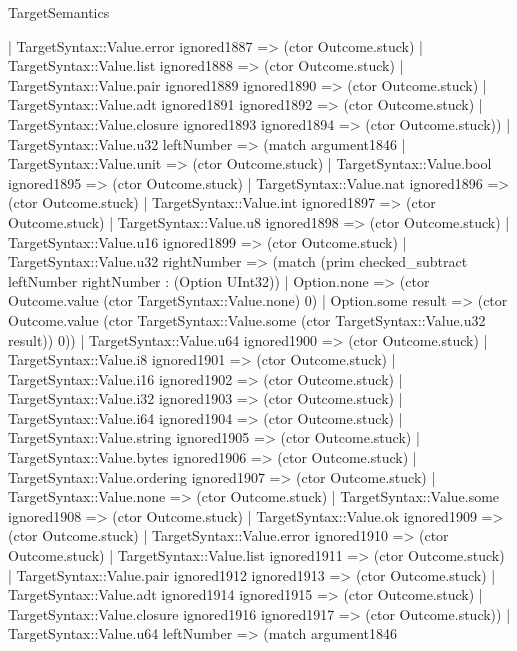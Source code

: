 \begin{lexlean}{TargetSemantics}
\begin{semanticmodule}
{              | TargetSyntax::Value.error ignored1887 => (ctor Outcome.stuck)
              | TargetSyntax::Value.list ignored1888 => (ctor Outcome.stuck)
              | TargetSyntax::Value.pair ignored1889 ignored1890 => (ctor Outcome.stuck)
              | TargetSyntax::Value.adt ignored1891 ignored1892 => (ctor Outcome.stuck)
              | TargetSyntax::Value.closure ignored1893 ignored1894 => (ctor Outcome.stuck))
            | TargetSyntax::Value.u32 leftNumber => (match argument1846
              | TargetSyntax::Value.unit => (ctor Outcome.stuck)
              | TargetSyntax::Value.bool ignored1895 => (ctor Outcome.stuck)
              | TargetSyntax::Value.nat ignored1896 => (ctor Outcome.stuck)
              | TargetSyntax::Value.int ignored1897 => (ctor Outcome.stuck)
              | TargetSyntax::Value.u8 ignored1898 => (ctor Outcome.stuck)
              | TargetSyntax::Value.u16 ignored1899 => (ctor Outcome.stuck)
              | TargetSyntax::Value.u32 rightNumber => (match (prim checked_subtract leftNumber rightNumber : (Option UInt32))
                | Option.none => (ctor Outcome.value (ctor TargetSyntax::Value.none) 0)
                | Option.some result => (ctor Outcome.value (ctor TargetSyntax::Value.some (ctor TargetSyntax::Value.u32 result)) 0))
              | TargetSyntax::Value.u64 ignored1900 => (ctor Outcome.stuck)
              | TargetSyntax::Value.i8 ignored1901 => (ctor Outcome.stuck)
              | TargetSyntax::Value.i16 ignored1902 => (ctor Outcome.stuck)
              | TargetSyntax::Value.i32 ignored1903 => (ctor Outcome.stuck)
              | TargetSyntax::Value.i64 ignored1904 => (ctor Outcome.stuck)
              | TargetSyntax::Value.string ignored1905 => (ctor Outcome.stuck)
              | TargetSyntax::Value.bytes ignored1906 => (ctor Outcome.stuck)
              | TargetSyntax::Value.ordering ignored1907 => (ctor Outcome.stuck)
              | TargetSyntax::Value.none => (ctor Outcome.stuck)
              | TargetSyntax::Value.some ignored1908 => (ctor Outcome.stuck)
              | TargetSyntax::Value.ok ignored1909 => (ctor Outcome.stuck)
              | TargetSyntax::Value.error ignored1910 => (ctor Outcome.stuck)
              | TargetSyntax::Value.list ignored1911 => (ctor Outcome.stuck)
              | TargetSyntax::Value.pair ignored1912 ignored1913 => (ctor Outcome.stuck)
              | TargetSyntax::Value.adt ignored1914 ignored1915 => (ctor Outcome.stuck)
              | TargetSyntax::Value.closure ignored1916 ignored1917 => (ctor Outcome.stuck))
            | TargetSyntax::Value.u64 leftNumber => (match argument1846
}
\end{semanticmodule}
\end{lexlean}
